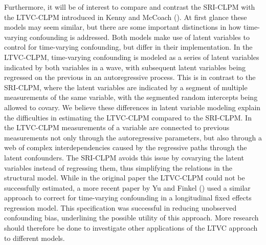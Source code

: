 \documentclass[
  man,
  floatsintext,
  longtable,
  nolmodern,
  notxfonts,
  notimes,
  colorlinks=true,linkcolor=blue,citecolor=blue,urlcolor=blue]{apa7}
\begin{document}
Furthermore, it will be of interest to compare and contrast the SRI-CLPM
with the LTVC-CLPM introduced in Kenny and McCoach
(). At first glance these
models may seem similar, but there are some important distinctions in
how time-varying confounding is addressed. Both models make use of
latent variables to control for time-varying confounding, but differ in
their implementation. In the LTVC-CLPM, time-varying confounding is
modeled as a series of latent variables indicated by both variables in a
wave, with subsequent latent variables being regressed on the previous
in an autoregressive process. This is in contrast to the SRI-CLPM, where
the latent variables are indicated by a segment of multiple measurements
of the same variable, with the segmented random intercepts being allowed
to covary. We believe these differences in latent variable modeling
explain the difficulties in estimating the LTVC-CLPM compared to the
SRI-CLPM. In the LTVC-CLPM measurements of a variable are connected to
previous measurements not only through the autoregressive parameters,
but also through a web of complex interdependencies caused by the
regressive paths through the latent confounders. The SRI-CLPM avoids
this issue by covarying the latent variables instead of regressing them,
thus simplifying the relations in the structural model. While in the
original paper the LTVC-CLPM could not be successfully estimated, a more
recent paper by Yu and Finkel
() used a
similar approach to correct for time-varying confounding in a
longitudinal fixed effects regression model. This specification was
successful in reducing unobserved confounding bias, underlining the
possible utility of this approach. More research should therefore be
done to investigate other applications of the LTVC approach to different
models.
\end{document}
